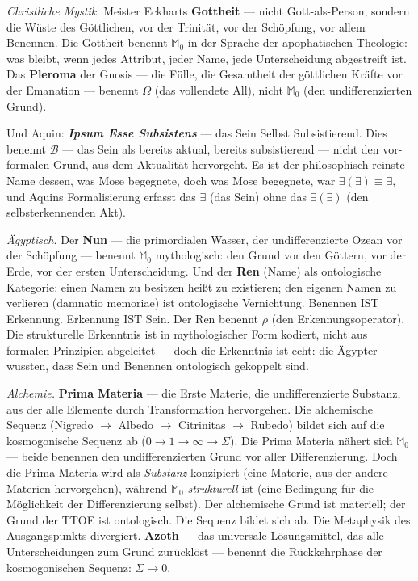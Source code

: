 \documentclass[10pt, openany, oneside]{book}
\begin{document}
\textit{Christliche Mystik.} Meister Eckharts \textbf{Gottheit} --- nicht Gott-als-Person, sondern die Wüste des Göttlichen, vor der Trinität, vor der Schöpfung, vor allem Benennen. Die Gottheit benennt $\mathbb{M}_0$ in der Sprache der apophatischen Theologie: was bleibt, wenn jedes Attribut, jeder Name, jede Unterscheidung abgestreift ist. Das \textbf{Pleroma} der Gnosis --- die Fülle, die Gesamtheit der göttlichen Kräfte vor der Emanation --- benennt $\Omega$ (das vollendete All), nicht $\mathbb{M}_0$ (den undifferenzierten Grund).

Und Aquin: \textbf{\textit{Ipsum Esse Subsistens}} --- das Sein Selbst Subsistierend. Dies benennt $\mathcal{B}$ --- das Sein als bereits aktual, bereits subsistierend --- nicht den vor-formalen Grund, aus dem Aktualität hervorgeht. Es ist der philosophisch reinste Name dessen, was Mose begegnete, doch was Mose begegnete, war $\exists(\exists) \equiv \exists$, und Aquins Formalisierung erfasst das $\exists$ (das Sein) ohne das $\exists(\exists)$ (den selbsterkennenden Akt).

\textit{Ägyptisch.} Der \textbf{Nun} --- die primordialen Wasser, der undifferenzierte Ozean vor der Schöpfung --- benennt $\mathbb{M}_0$ mythologisch: den Grund vor den Göttern, vor der Erde, vor der ersten Unterscheidung. Und der \textbf{Ren} (Name) als ontologische Kategorie: einen Namen zu besitzen heißt zu existieren; den eigenen Namen zu verlieren (damnatio memoriae) ist ontologische Vernichtung. Benennen IST Erkennung. Erkennung IST Sein. Der Ren benennt $\rho$ (den Erkennungsoperator). Die strukturelle Erkenntnis ist in mythologischer Form kodiert, nicht aus formalen Prinzipien abgeleitet --- doch die Erkenntnis ist echt: die Ägypter wussten, dass Sein und Benennen ontologisch gekoppelt sind.

\textit{Alchemie.} \textbf{Prima Materia} --- die Erste Materie, die undifferenzierte Substanz, aus der alle Elemente durch Transformation hervorgehen. Die alchemische Sequenz (Nigredo $\to$ Albedo $\to$ Citrinitas $\to$ Rubedo) bildet sich auf die kosmogonische Sequenz ab ($0 \to 1 \to \infty \to \Sigma$). Die Prima Materia nähert sich $\mathbb{M}_0$ --- beide benennen den undifferenzierten Grund vor aller Differenzierung. Doch die Prima Materia wird als \textit{Substanz} konzipiert (eine Materie, aus der andere Materien hervorgehen), während $\mathbb{M}_0$ \textit{strukturell} ist (eine Bedingung für die Möglichkeit der Differenzierung selbst). Der alchemische Grund ist materiell; der Grund der TTOE ist ontologisch. Die Sequenz bildet sich ab. Die Metaphysik des Ausgangspunkts divergiert. \textbf{Azoth} --- das universale Lösungsmittel, das alle Unterscheidungen zum Grund zurücklöst --- benennt die Rückkehrphase der kosmogonischen Sequenz: $\Sigma \to 0$.
\end{document}
